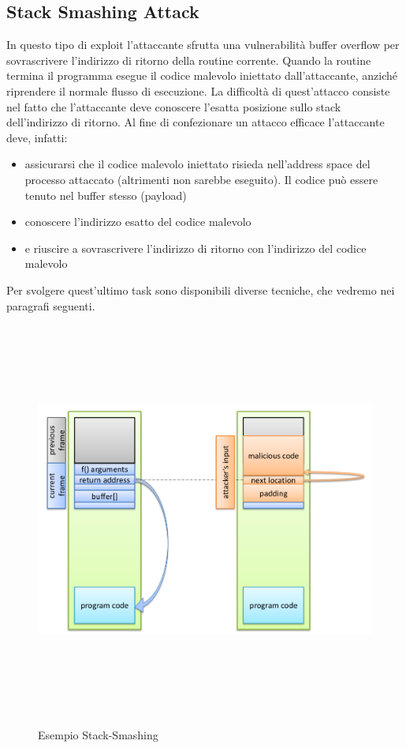 \subsection{Stack Smashing Attack}
In questo tipo di exploit l'attaccante sfrutta una vulnerabilità buffer overflow per sovrascrivere l'indirizzo di ritorno della routine corrente. Quando la routine termina il programma esegue il codice malevolo iniettato dall'attaccante, anziché riprendere il normale flusso di esecuzione. La difficoltà di quest'attacco consiste nel fatto che l'attaccante deve conoscere l'esatta posizione sullo stack dell'indirizzo di ritorno. Al fine di confezionare un attacco efficace l'attaccante deve, infatti:
\begin{itemize}
  \item assicurarsi che il codice malevolo iniettato risieda nell'address space del processo attaccato (altrimenti non sarebbe eseguito). Il codice può essere tenuto nel buffer stesso (payload)
  \item conoscere l'indirizzo esatto del codice malevolo
  \item e riuscire a sovrascrivere l'indirizzo di ritorno con l'indirizzo del codice malevolo
\end{itemize}
Per svolgere quest'ultimo task sono disponibili diverse tecniche, che vedremo nei paragrafi seguenti.
\begin{figure}[htbp]
	\centering%
	\subfigure%
	{\includegraphics[height=13cm, width=13cm, keepaspectratio]{Immagini/sistemi_operativi/stack_smash.png}}
	\caption{Esempio Stack-Smashing\label{fig:stack_smash}} 	
\end{figure}
